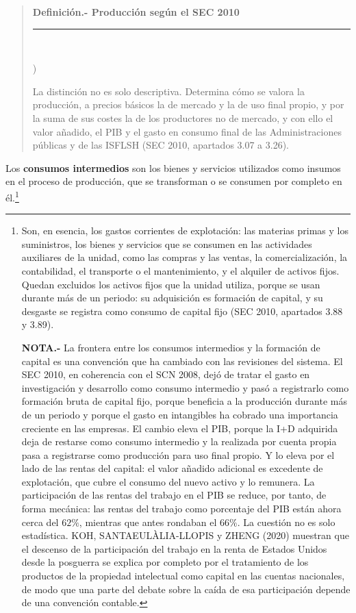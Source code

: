 \documentclass[10pt,a4paper]{article}
\newcounter{alphaitem}
\newenvironment{la}
      {\begin{list}{\alph{alphaitem})}{%
          \usecounter{alphaitem}%
          \setlength{\leftmargin}{1cm}%
          \setlength{\parskip}{3pt}%
          \setlength{\itemsep}{0pt}%
          \setlength{\parsep}{0pt}%
      }}
      {\end{list}}
\newenvironment{specialblock}[1]{%
      \begin{quote} %
      \small %
      \noindent\textbf{#1}\\[-0.3em] %
      \rule{\linewidth}{0.4pt}\\[0.6em]}{
      \end{quote}}
\begin{document}
\begin{specialblock}{\textbf{Definición.-} Producción según el SEC 2010}
\begin{la}
    \end{la}
    La distinción no es solo descriptiva. Determina cómo se valora la producción, a precios básicos la de mercado y la de uso final propio, y por la suma de sus costes la de los productores no de mercado, y con ello el valor añadido, el PIB y el gasto en consumo final de las Administraciones públicas y de las ISFLSH (SEC 2010, apartados 3.07 a 3.26).
\end{specialblock}

Los \textbf{consumos intermedios} son los bienes y servicios utilizados como insumos en el proceso de producción, que se transforman o se consumen por completo en él.\footnote{%
  Son, en esencia, los gastos corrientes de explotación: las materias primas y los suministros, los bienes y servicios que se consumen en las actividades auxiliares de la unidad, como las compras y las ventas, la comercialización, la contabilidad, el transporte o el mantenimiento, y el alquiler de activos fijos. Quedan excluidos los activos fijos que la unidad utiliza, porque se usan durante más de un periodo: su adquisición es formación de capital, y su desgaste se registra como consumo de capital fijo (SEC 2010, apartados 3.88 y 3.89).

  \textbf{NOTA.-} La frontera entre los consumos intermedios y la formación de capital es una convención que ha cambiado con las revisiones del sistema. El SEC 2010, en coherencia con el SCN 2008, dejó de tratar el gasto en investigación y desarrollo como consumo intermedio y pasó a registrarlo como formación bruta de capital fijo, porque beneficia a la producción durante más de un periodo y porque el gasto en intangibles ha cobrado una importancia creciente en las empresas. El cambio eleva el PIB, porque la I+D adquirida deja de restarse como consumo intermedio y la realizada por cuenta propia pasa a registrarse como producción para uso final propio. Y lo eleva por el lado de las rentas del capital: el valor añadido adicional es excedente de explotación, que cubre el consumo del nuevo activo y lo remunera. La participación de las rentas del trabajo en el PIB se reduce, por tanto, de forma mecánica: las rentas del trabajo como porcentaje del PIB están ahora cerca del $62\%$, mientras que antes rondaban el $66\%$. La cuestión no es solo estadística. KOH, SANTAEULÀLIA-LLOPIS y ZHENG (2020) muestran que el descenso de la participación del trabajo en la renta de Estados Unidos desde la posguerra se explica por completo por el tratamiento de los productos de la propiedad intelectual como capital en las cuentas nacionales, de modo que una parte del debate sobre la caída de esa participación depende de una convención contable.
}
\end{document}
